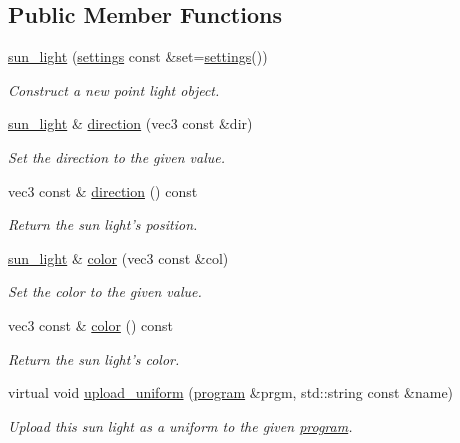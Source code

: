 \subsection*{Public Member Functions}
\begin{DoxyCompactItemize}
\item 
\hyperlink{classgfx_1_1sun__light_a5eae2825f289f6ebdebdab8c85e41418}{sun\-\_\-light} (\hyperlink{classgfx_1_1sun__light_1_1settings}{settings} const \&set=\hyperlink{classgfx_1_1sun__light_1_1settings}{settings}())
\begin{DoxyCompactList}\small\item\em Construct a new point light object. \end{DoxyCompactList}\item 
\hyperlink{classgfx_1_1sun__light}{sun\-\_\-light} \& \hyperlink{classgfx_1_1sun__light_a102d948915e57b43b7f0f6ce330dcfcf}{direction} (vec3 const \&dir)
\begin{DoxyCompactList}\small\item\em Set the direction to the given value. \end{DoxyCompactList}\item 
vec3 const \& \hyperlink{classgfx_1_1sun__light_a30ec1f02407dd950786af10a2933bbda}{direction} () const 
\begin{DoxyCompactList}\small\item\em Return the sun light's position. \end{DoxyCompactList}\item 
\hyperlink{classgfx_1_1sun__light}{sun\-\_\-light} \& \hyperlink{classgfx_1_1sun__light_ab4c40166ba1db4b06a86b793daf02126}{color} (vec3 const \&col)
\begin{DoxyCompactList}\small\item\em Set the color to the given value. \end{DoxyCompactList}\item 
vec3 const \& \hyperlink{classgfx_1_1sun__light_a3b3b41478593d41dc9c840fe975a5bc4}{color} () const 
\begin{DoxyCompactList}\small\item\em Return the sun light's color. \end{DoxyCompactList}\item 
virtual void \hyperlink{classgfx_1_1sun__light_a786c5ed1b4b222b38143e7d521459236}{upload\-\_\-uniform} (\hyperlink{classgfx_1_1program}{program} \&prgm, std\-::string const \&name)
\begin{DoxyCompactList}\small\item\em Upload this sun light as a uniform to the given \hyperlink{classgfx_1_1program}{program}. \end{DoxyCompactList}\end{DoxyCompactItemize}
